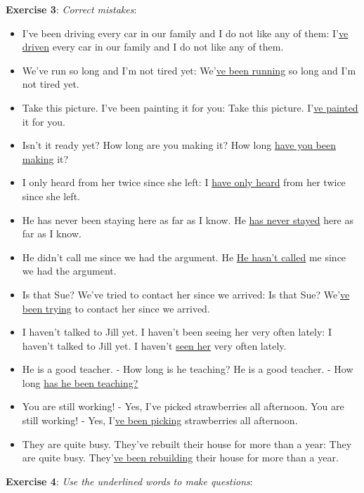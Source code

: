 \textbf{Exercise 3}: \textit{Correct mistakes}:

\begin{itemize}

\item I've been driving every car in our family and I do not like any of them: I'\underline{ve driven} every car in our family and I do not like any of them.
\item We've run so long and I'm not tired yet: We'\underline{ve been running} so long and I'm not tired yet.
\item Take this picture. I've been painting it for you: Take this picture. I'\underline{ve painted} it for you.
\item Isn't it ready yet? How long are you making it? How long \underline{have you been making} it?
\item I only heard from her twice since she left: I \underline{have only heard} from her twice since she left.
\item He has never been staying here as far as I know. He \underline{has never stayed} here as far as I know.
\item He didn't call me since we had the argument. He \underline{He hasn't called} me since we had the argument.
\item Is that Sue? We've tried to contact her since we arrived: Is that Sue? We'\underline{ve been trying} to contact her since we arrived.
\item I haven't talked to Jill yet. I haven't been seeing her very often lately: I haven't talked to Jill yet. I haven't \underline{seen her} very often lately.
\item He is a good teacher. - How long is he teaching? He is a good teacher. - How long \underline{has he been teaching?}
\item You are still working! - Yes, I've picked strawberries all afternoon. You are still working! - Yes, I'\underline{ve been picking} strawberries all afternoon.
\item They are quite busy. They've rebuilt their house for more than a year: They are quite busy. They'\underline{ve been rebuilding} their house for more than a year.

\end{itemize}

\textbf{Exercise 4}: \textit{Use the underlined words to make questions}:

